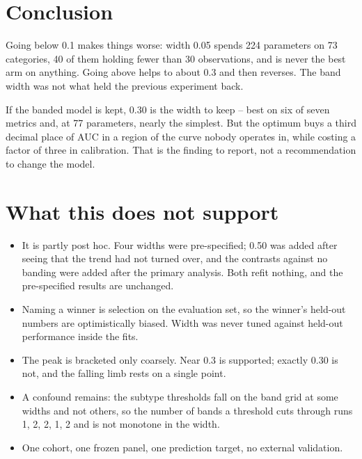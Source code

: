 \documentclass[11pt]{article}
\begin{document}
\section*{Conclusion}

Going below 0.1 makes things worse: width 0.05 spends 224 parameters on 73 categories, 40 of them holding fewer than 30 observations, and is never the best arm on anything. Going above helps to about 0.3 and then reverses. The band width was not what held the previous experiment back.

If the banded model is kept, 0.30 is the width to keep -- best on six of seven metrics and, at 77 parameters, nearly the simplest. But the optimum buys a third decimal place of AUC in a region of the curve nobody operates in, while costing a factor of three in calibration. That is the finding to report, not a recommendation to change the model.

\section*{What this does not support}

\begin{itemize}
  \item It is partly post hoc. Four widths were pre-specified; 0.50 was added after seeing that the trend had not turned over, and the contrasts against no banding were added after the primary analysis. Both refit nothing, and the pre-specified results are unchanged.
  \item Naming a winner is selection on the evaluation set, so the winner's held-out numbers are optimistically biased. Width was never tuned against held-out performance inside the fits.
  \item The peak is bracketed only coarsely. Near 0.3 is supported; exactly 0.30 is not, and the falling limb rests on a single point.
  \item A confound remains: the subtype thresholds fall on the band grid at some widths and not others, so the number of bands a threshold cuts through runs 1, 2, 2, 1, 2 and is not monotone in the width.
  \item One cohort, one frozen panel, one prediction target, no external validation.
\end{itemize}
\end{document}
